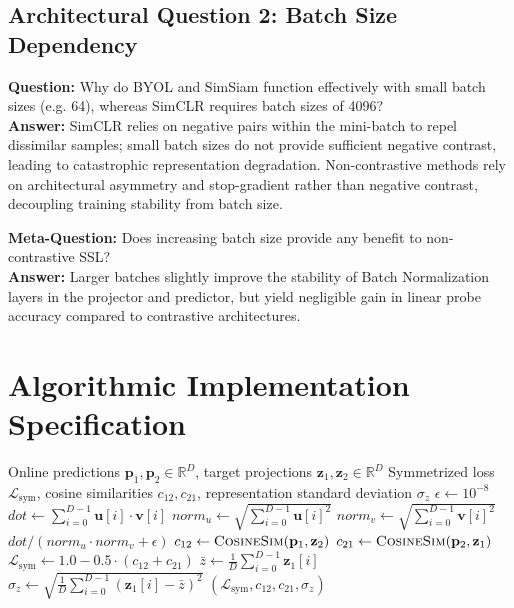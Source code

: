 \documentclass[11pt,a4paper]{article}
\theoremstyle{definition}
\begin{document}
\subsection{Architectural Question 2: Batch Size Dependency}
\textbf{Question:} Why do BYOL and SimSiam function effectively with small batch sizes (e.g. 64), whereas SimCLR requires batch sizes of 4096?\\
\textbf{Answer:} SimCLR relies on negative pairs within the mini-batch to repel dissimilar samples; small batch sizes do not provide sufficient negative contrast, leading to catastrophic representation degradation. Non-contrastive methods rely on architectural asymmetry and stop-gradient rather than negative contrast, decoupling training stability from batch size.

\textbf{Meta-Question:} Does increasing batch size provide any benefit to non-contrastive SSL?\\
\textbf{Answer:} Larger batches slightly improve the stability of Batch Normalization layers in the projector and predictor, but yield negligible gain in linear probe accuracy compared to contrastive architectures.

\section{Algorithmic Implementation Specification}

\begin{algorithm}[H]
\caption{Non-Contrastive Dual-View Symmetrized Loss Evaluation}
\begin{algorithmic}[1]
\Require Online predictions $\mathbf{p}_1, \mathbf{p}_2 \in \mathbb{R}^D$, target projections $\mathbf{z}_1, \mathbf{z}_2 \in \mathbb{R}^D$
\Ensure Symmetrized loss $\mathcal{L}_{\text{sym}}$, cosine similarities $c_{12}, c_{21}$, representation standard deviation $\sigma_z$
    \State $\epsilon \gets 10^{-8}$
    \State $dot \gets \sum_{i=0}^{D-1} \mathbf{u}[i] \cdot \mathbf{v}[i]$
    \State $norm_u \gets \sqrt{\sum_{i=0}^{D-1} \mathbf{u}[i]^2}$
    \State $norm_v \gets \sqrt{\sum_{i=0}^{D-1} \mathbf{v}[i]^2}$
    \State \Return $dot / (norm_u \cdot norm_v + \epsilon)$
\EndFunction
\State $c_{12} \gets \Call{CosineSim}{\mathbf{p}_1, \mathbf{z}_2}$
\State $c_{21} \gets \Call{CosineSim}{\mathbf{p}_2, \mathbf{z}_1}$
\State $\mathcal{L}_{\text{sym}} \gets 1.0 - 0.5 \cdot (c_{12} + c_{21})$
\State $\bar{z} \gets \frac{1}{D}\sum_{i=0}^{D-1} \mathbf{z}_1[i]$
\State $\sigma_z \gets \sqrt{\frac{1}{D}\sum_{i=0}^{D-1} (\mathbf{z}_1[i] - \bar{z})^2}$
\State \Return $(\mathcal{L}_{\text{sym}}, c_{12}, c_{21}, \sigma_z)$
\end{algorithmic}
\end{algorithm}
\end{document}
